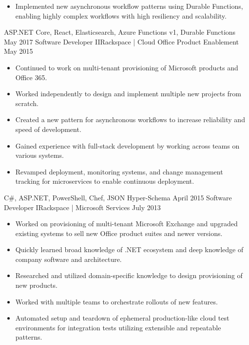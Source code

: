 \begin{experiences}
{\begin{itemize}
                        \item Implemented new asynchronous workflow patterns using Durable Functions, enabling highly complex workflows with high resiliency and scalability.
                      \end{itemize}
                    }
                    {ASP.NET Core, React, Elasticsearch, Azure Functions v1, Durable Functions}
  \emptySeparator
  \experience
    {May 2017}     {Software Developer II}{Rackspace | Cloud Office Product Enablement}
    {May 2015}     {
                      \begin{itemize}
                        \item Continued to work on multi-tenant provisioning of Microsoft products and Office 365.
                        \item Worked independently to design and implement multiple new projects from scratch.
                        \item Created a new pattern for asynchronous workflows to increase reliability and speed of development.
                        \item Gained experience with full-stack development by working across teams on various systems.
                        \item Revamped deployment, monitoring systems, and change management tracking for microservices to enable continuous deployment.
                      \end{itemize}
                    }
                    {C\#, ASP.NET, PowerShell, Chef, JSON Hyper-Schema}
  \emptySeparator
  \experience
  {April 2015}       {Software Developer I}{Rackspace | Microsoft Services}
  {July 2013}        {
                      \begin{itemize}
                        \item Worked on provisioning of multi-tenant Microsoft Exchange and upgraded existing systems to sell new Office product suites and newer versions.
                        \item Quickly learned broad knowledge of .NET ecosystem and deep knowledge of company software and architecture.
                        \item Researched and utilized domain-specific knowledge to design provisioning of new products.
                        \item Worked with multiple teams to orchestrate rollouts of new features.
                        \item Automated setup and teardown of ephemeral production-like cloud test environments for integration tests utilizing extensible and repeatable patterns.

\end{itemize}}
\end{experiences}
